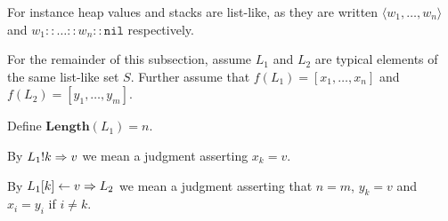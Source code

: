 For instance heap values and stacks are list-like, as they are written
$\langle w_1, \dots, w_n \rangle$ and $w_1 :: \dots :: w_n :: \mathtt{nil}$
respectively.

For the remainder of this subsection, assume $L_1$ and $L_2$ are typical
elements of the same list-like set $S$. Further assume that
$f(L_1) = [x_1, \dots, x_n]$ and $f(L_2) = [y_1, \dots, y_m]$.

Define $\mathbf{Length}(L_1) = n$.

By ${L_1} ! {k} => {v}$ we mean a judgment asserting $x_k = v$.

By ${L_1}[{k}] <- {v} => {L_2}$ we mean a judgment asserting that $n=m$, $y_k=v$
and $x_i = y_i$ if $i \neq k$.
